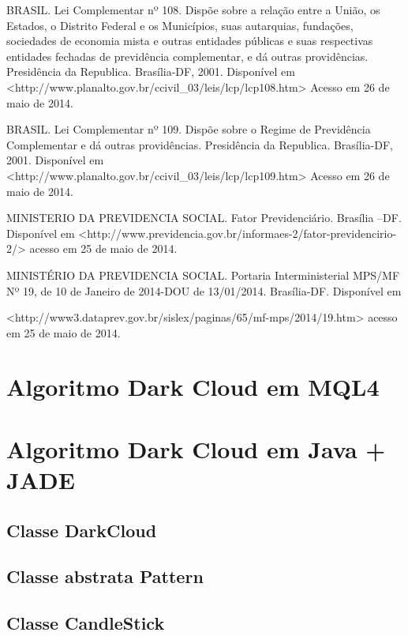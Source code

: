 \begin{apendicesenv}
BRASIL. Lei Complementar nº 108. Dispõe sobre a relação entre a União, os Estados, o Distrito Federal e os Municípios, suas autarquias, fundações, sociedades de economia mista e outras entidades públicas e suas respectivas entidades fechadas de previdência complementar, e dá outras providências. Presidência da Republica. Brasília-DF, 2001. Disponível em  
<http://www.planalto.gov.br/ccivil\_03/leis/lcp/lcp108.htm> 
Acesso em 26 de maio de 2014.

BRASIL. Lei Complementar nº 109. Dispõe sobre o Regime de Previdência Complementar e dá outras providências. Presidência da Republica. Brasília-DF, 2001. Disponível em 
<http://www.planalto.gov.br/ccivil\_03/leis/lcp/lcp109.htm> Acesso em 26 de maio de 2014.

MINISTERIO DA PREVIDENCIA SOCIAL. Fator Previdenciário. Brasília –DF. Disponível em 
<http://www.previdencia.gov.br/informaes-2/fator-previdencirio-2/>
 acesso em 25 de maio de 2014.

MINISTÉRIO DA PREVIDENCIA SOCIAL. Portaria Interministerial MPS/MF Nº 19, de 10 de Janeiro de 2014-DOU de 13/01/2014. Brasília-DF. Disponível em

<http://www3.dataprev.gov.br/sislex/paginas/65/mf-mps/2014/19.htm>  
acesso em 25 de maio de 2014.

\chapter[ALGORITMO DARK CLOUD EM MQL4]{Algoritmo Dark Cloud em MQL4}


\chapter[ALGORITMO DARK CLOUD EM JAVA + JADE]{Algoritmo Dark Cloud em Java + JADE}
\section{Classe DarkCloud}


\section{Classe abstrata Pattern}


\section{Classe CandleStick}




\end{apendicesenv}
